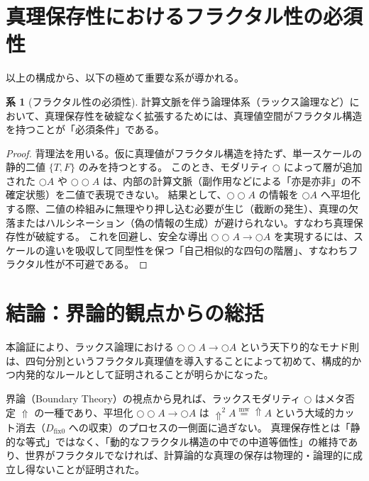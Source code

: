 \documentclass[11pt,a4paper]{article}
\theoremstyle{definition}
\newtheorem{corollary}{系}[section]
\newcommand{\mweq}{\mathrel{\overset{\mathrm{mw}}{=}}}
\newcommand{\dfix}{D_{\mathrm{fix}0}} %
\newcommand{\metanegation}{\Uparrow}
\newcommand{\Lax}{\bigcirc} %
\begin{document}
\section{真理保存性におけるフラクタル性の必須性}

以上の構成から、以下の極めて重要な系が導かれる。

\begin{corollary}[フラクタル性の必須性]
計算文脈を伴う論理体系（ラックス論理など）において、真理保存性を破綻なく拡張するためには、真理値空間がフラクタル構造を持つことが「必須条件」である。
\end{corollary}
\begin{proof}
背理法を用いる。仮に真理値がフラクタル構造を持たず、単一スケールの静的二値 $\{T, F\}$ のみを持つとする。
このとき、モダリティ $\Lax$ によって層が追加された $\Lax A$ や $\Lax\Lax A$ は、内部の計算文脈（副作用などによる「亦是亦非」の不確定状態）を二値で表現できない。
結果として、$\Lax\Lax A$ の情報を $\Lax A$ へ平坦化する際、二値の枠組みに無理やり押し込む必要が生じ（截断の発生）、真理の欠落またはハルシネーション（偽の情報の生成）が避けられない。すなわち真理保存性が破綻する。
これを回避し、安全な導出 $\Lax\Lax A \to \Lax A$ を実現するには、スケールの違いを吸収して同型性を保つ「自己相似的な四句の階層」、すなわちフラクタル性が不可避である。
\end{proof}

\section{結論：界論的観点からの総括}

本論証により、ラックス論理における $\Lax\Lax A \to \Lax A$ という天下り的なモナド則は、四句分別というフラクタル真理値を導入することによって初めて、構成的かつ内発的なルールとして証明されることが明らかになった。

界論（Boundary Theory）の視点から見れば、ラックスモダリティ $\Lax$ はメタ否定 $\metanegation$ の一種であり、平坦化 $\Lax\Lax A \to \Lax A$ は $\metanegation^2 A \mweq \metanegation A$ という大域的カット消去（$\dfix$ への収束）のプロセスの一側面に過ぎない。
真理保存性とは「静的な等式」ではなく、「動的なフラクタル構造の中での中道等価性」の維持であり、世界がフラクタルでなければ、計算論的な真理の保存は物理的・論理的に成立し得ないことが証明された。
\end{document}
